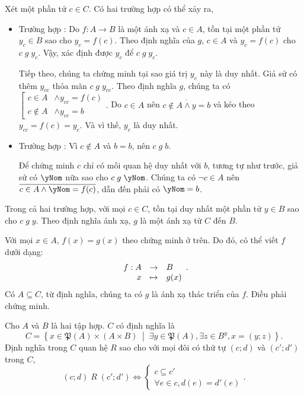 Xét một phần tử $c \in C$. Có hai trường hợp có thể xảy ra,
\begin{itemize}
   \item Trường hợp : Do $f: A \to B$ là một ánh xạ và $c \in A$, tồn tại một phần tử $y_c \in B$ sao cho $y_c = f(c)$. Theo định nghĩa của $g$, $c \in A$ và $y_c = f(c)$ cho $c\;g\;y_c$. Vậy, xác định được $y_c$ để $c\;g\;y_c$.
   
   Tiếp theo, chúng ta chứng minh tại sao giá trị $y_c$ này là duy nhất. Giả sử có thêm $y_{cc}$ thỏa mãn $c\;g\;y_{cc}$. Theo định nghĩa $g$, chúng ta có $
      \left[\begin{aligned}
         c \in A &\land y_{cc} = f(c) \\
         c \notin A &\land y_{cc} = b
      \end{aligned}\right..
   $ Do $c \in A$ nên $\overline{c \notin A \land y = b}$ và kéo theo $y_{cc} = f(c) = y_c$. Và vì thế, $y_c$ là duy nhất.

   \item Trường hợp : Vì $c \notin A$ và $b = b$, nên $c\;g\;b$. 
   
   Để chứng minh $c$ chỉ có mối quan hệ duy nhất với $b$, tương tự như trước, giả sử có $\yNom$ nữa sao cho $c\;g\;\yNom$. Chúng ta có $\neg c \in A$ nên $\overline{c \in A \land \yNom = f(c)}$, dẫn đến phải có $\yNom = b$.
\end{itemize}

Trong cả hai trường hợp, với mọi $c \in C$, tồn tại duy nhất một phần tử $y \in B$ sao cho $c\;g\;y$. Theo định nghĩa ánh xạ, $g$ là một ánh xạ từ $C$ đến $B$.

Với mọi $x \in A$, $f(x) = g(x)$ theo chứng minh ở trên. Do đó, có thể viết $f$ dưới dạng:
\begin{equation*}
   \begin{array}[t]{rcl}
      f: A & \to & B \\
      x & \mapsto & g(x)
   \end{array}.
\end{equation*}
Có $A\subseteq C$, từ định nghĩa, chúng ta có $g$ là ánh xạ thác triển của $f$. Điều phải chứng minh.

\exercise Cho $A$ và $B$ là hai tập hợp. $C$ có định nghĩa là
\begin{equation*}
   C = \left\{x \in \mathfrak{P}(A) \times (A \times B)\;\middle|\;\exists y \in \mathfrak{P}(A), \exists z \in B^y, x = (y; z)\right\}.
\end{equation*}
Định nghĩa trong $C$ quan hệ $R$ sao cho với mọi đôi có thứ tự $(c; d)$ và $(c'; d')$ trong $C$,
\begin{equation*}
   (c; d)\;R\;(c'; d') \iff \begin{cases}
      c \subseteq c' \\
      \forall e \in c, d(e) = d'(e) 
   \end{cases}.
\end{equation*}

